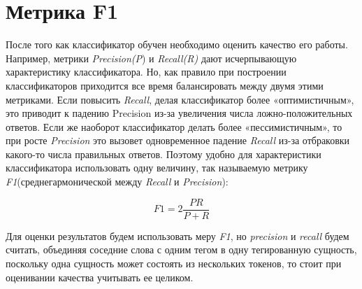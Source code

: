 \documentclass{csmathnotes}
\begin{document}
\section*{Метрика F1}
После того как классификатор обучен необходимо оценить качество его работы. Например, метрики \emph{Precision(P}) и \emph{Recall(R)} дают исчерпывающую характеристику классификатора. Но, как правило при построении классификаторов приходится все время балансировать между двумя этими метриками. Если повысить \emph{Recall}, делая классификатор более «оптимистичным», это приводит к падению Precision из-за увеличения числа ложно-положительных ответов. Если же наоборот классификатор делать более «пессимистичным», то при росте \emph{Precision} это вызовет одновременное падение \emph{Recall} из-за отбраковки какого-то числа правильных ответов. Поэтому удобно для характеристики классификатора использовать одну величину, так называемую метрику \emph{F1}(среднегармонической между \emph{Recall} и \emph{Precision}):

\begin{equation}\label{eq:f1}
F1 = 2\frac{P R}{P + R} 
\end{equation}

Для оценки результатов будем использовать меру \emph{F1}, но \emph{precision} и \emph{recall} будем считать, объединяя соседние слова с одним тегом в одну тегированную сущность, поскольку одна сущность может состоять из нескольких токенов, то стоит при оценивании качества учитывать ее целиком. 
\end{document}
